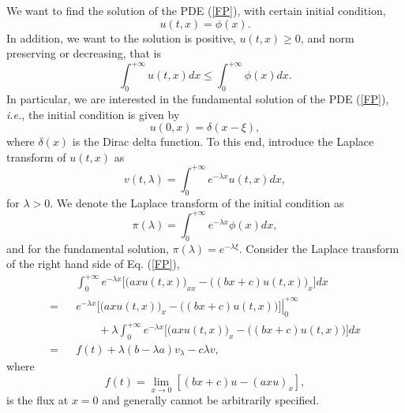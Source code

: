 \documentclass[12pt]{article}
\begin{document}
  We want to find the solution of the PDE (\ref{FP}), with certain initial condition,
  \begin{equation}
    u(t,x) = \phi(x).
    \label{init0}
  \end{equation}
  In addition, we want to the solution is positive, $u(t,x)\ge 0$, and norm preserving or decreasing, that is
  \begin{equation}
    \int_0^{+\infty}u(t,x)dx \le \int_0^{+\infty}\phi(x)dx.
  \end{equation}
  In particular, we are
  interested in the fundamental solution of the PDE (\ref{FP}), {\it i.e.}, the initial condition is given
  by
  \begin{equation}
    u(0,x)=\delta(x-\xi),
    \label{init}
  \end{equation}
  where $\delta(x)$ is the Dirac delta function. To this end, introduce the Laplace transform of $u(t,x)$ as
  \begin{equation}
    v(t,\lambda)=\int_0^{+\infty}e^{-\lambda x}u(t,x)dx,
  \end{equation}
  for $\lambda > 0$. We denote the Laplace transform of the initial condition as
  \begin{equation}
    \pi(\lambda) = \int_0^{+\infty}e^{-\lambda x}\phi(x)dx,
  \end{equation}
  and for the fundamental solution, $\pi(\lambda) = e^{-\lambda \xi}$.
  Consider the Laplace transform of the right hand side of Eq. (\ref{FP}),
  \begin{eqnarray}
      && \int_0^{+\infty} e^{-\lambda x}\bigg[\big(axu(t,x)\big)_{xx}-\big((bx+c)u(t,x)\big)_x\bigg]dx \nonumber\\
    = && \left. e^{-\lambda x}\bigg[\big(axu(t,x)\big)_{x}-\big((bx+c)u(t,x)\big)\bigg]\right|_0^{+\infty}\nonumber\\
      && \quad\quad +\lambda \int_0^{+\infty} e^{-\lambda x}\bigg[\big(axu(t,x)\big)_{x}-\big((bx+c)u(t,x)\big)\bigg]dx \nonumber\\
    = && f(t) + \lambda(b-\lambda a)v_{\lambda} - c\lambda v,
  \end{eqnarray}
  where
  \begin{equation}
    f(t) = \lim_{x\rightarrow 0}\left[(bx+c)u-(axu)_x\right],
  \end{equation}
  is the flux at $x=0$ and generally cannot be arbitrarily specified.
\end{document}

